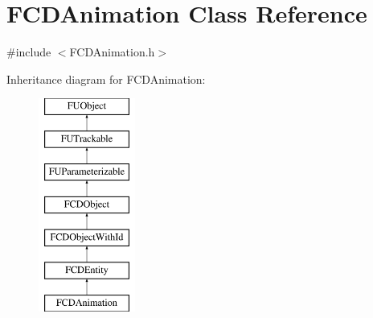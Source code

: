 \hypertarget{classFCDAnimation}{
\section{FCDAnimation Class Reference}
\label{classFCDAnimation}
}


{\ttfamily \#include $<$FCDAnimation.h$>$}

Inheritance diagram for FCDAnimation:\begin{figure}[H]
\begin{center}
\leavevmode
\includegraphics[height=7.000000cm]{classFCDAnimation}
\end{center}
\end{figure}
